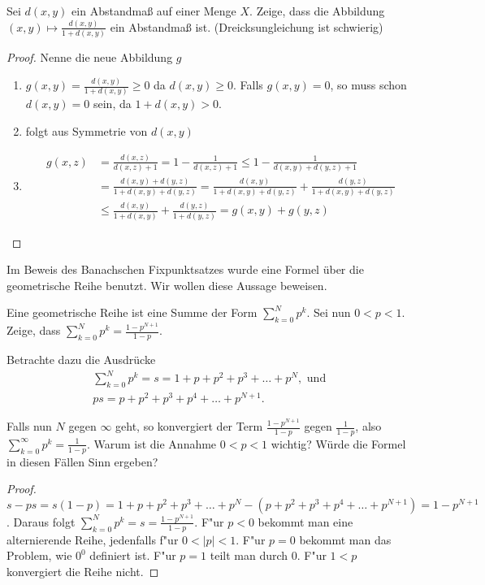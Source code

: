 \documentclass[a4paper,10pt]{article}
\begin{document}
 
\begin{Aufg}
Sei $d(x,y)$ ein Abstandmaß auf einer Menge $X$. Zeige, dass die Abbildung
 $(x,y) \mapsto \frac{d(x,y)}{1 + d(x,y)}$ ein Abstandmaß ist. (Dreicksungleichung ist schwierig)
\end{Aufg}
\begin{proof}
 Nenne die neue Abbildung $g$
 \begin{enumerate}
  \item $g(x,y)= \frac{d(x,y)}{1 + d(x,y)} \geq 0$ da $d(x,y) \geq 0$. Falls $g(x,y) =0$,
  so muss schon $d(x,y)=0$ sein, da $1+d(x,y) >0$.
  \item folgt aus Symmetrie von $d(x,y)$
  \item \begin{align*}
 g(x,z)
 &= \frac{d(x,z)}{d(x,z)+1}
 = 1 - \frac{1}{d(x,z)+1}
 \leq 1 - \frac{1}{d(x,y)+d(y,z)+1} \\
 &= \frac{d(x,y)+d(y,z)}{1+d(x,y)+d(y,z)}
 = \frac{d(x,y)}{1+d(x,y)+d(y,z)} + \frac{d(y,z)}{1+d(x,y)+d(y,z)}\\
 &\leq \frac{d(x,y)}{1+d(x,y)} + \frac{d(y,z)}{1+d(y,z)}
 = g(x,y) + g(y,z)
\end{align*}
 \end{enumerate}

 
\end{proof}



\begin{Aufg}
Im Beweis des Banachschen Fixpunktsatzes wurde eine Formel über die geometrische Reihe
benutzt. Wir wollen diese Aussage beweisen.

Eine geometrische Reihe ist eine Summe der Form $\sum_{k=0}^N p^k$. Sei nun \linebreak $0<p<1$.
Zeige, dass $\sum_{k=0}^N p^k=  \frac{1- p^{N+1}}{1 - p}$.

Betrachte dazu die Ausdrücke 
\begin{gather*}
 \sum_{k=0}^N p^k= s = 1 + p + p^2 + p^3 + \dots + p^N, \text{ und }\\
 ps =p +p^2 +p^3 + p^4 + \dots + p^{N+1}.
\end{gather*}

Falls nun $N$ gegen $\infty$ geht, so konvergiert der Term $\frac{1- p^{N+1}}{1 - p}$
gegen $\frac{1}{1 - p}$, also $\sum_{k=0}^\infty p^k=  \frac{1}{1 - p}$.
Warum ist die Annahme $0<p<1$ wichtig? Würde die Formel in diesen Fällen Sinn ergeben?
\end{Aufg}

\begin{proof}

$s -ps = s(1-p) = 1 + p + p^2 + p^3 + \dots + p^N - (p +p^2 +p^3 + p^4 + \dots + p^{N+1})
= 1 - p^{N+1}$. Daraus folgt $\sum_{k=0}^N p^k = s = \frac{1 - p^{N+1}}{1-p}$. F"ur $p<0$ 
bekommt man eine alternierende Reihe, jedenfalls f"ur $0<|p|<1$. F"ur $p=0$ bekommt man
das Problem, wie $0^0$ definiert ist. F"ur $p=1$ teilt man durch 0. F"ur $1<p$ konvergiert die Reihe 
nicht.
 
\end{proof}
\end{document}
